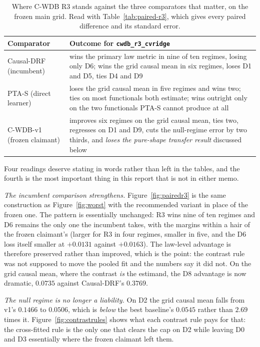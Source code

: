\documentclass[11pt,a4paper]{article}
\theoremstyle{definition}
\theoremstyle{remark}
\begin{document}
\begin{table}[htbp]
\centering
\caption{Where C-WDB R3 stands against the three comparators that matter, on the
frozen main grid. Read with Table~\ref{tab:paired-r3}, which gives every paired
difference and its standard error.}
\label{tab:r3-summary}
\small
\begin{tabular}{@{}lp{9.4cm}@{}}
\toprule
Comparator & Outcome for \texttt{cwdb\_r3\_cvridge} \\
\midrule
Causal-DRF (incumbent) & wins the primary law metric in nine of ten regimes,
losing only D6; wins the grid causal mean in six regimes, loses D1 and D5, ties
D4 and D9 \\
PTA-S (direct learner) & loses the grid causal mean in five regimes and wins two;
ties on most functionals both estimate; wins outright only on the two functionals
PTA-S cannot produce at all \\
C-WDB-v1 (frozen claimant) & improves six regimes on the grid causal mean, ties
two, regresses on D1 and D9, cuts the null-regime error by two thirds, and
\emph{loses the pure-shape transfer result} discussed below \\
\bottomrule
\end{tabular}
\end{table}

Four readings deserve stating in words rather than left in the tables, and the
fourth is the most important thing in this report that is not in either memo.

\emph{The incumbent comparison strengthens.} Figure~\ref{fig:pairedr3} is the
same construction as Figure~\ref{fig:worst} with the recommended variant in place
of the frozen one. The pattern is essentially unchanged: R3 wins nine of ten
regimes and D6 remains the only one the incumbent takes, with the margins within
a hair of the frozen claimant's (larger for R3 in four regimes, smaller in five,
and the D6 loss itself smaller at $+0.0131$ against $+0.0163$). The law-level
advantage is therefore preserved rather than improved, which is the point: the
contrast rule was not supposed to move the pooled fit and the numbers say it did
not. On the grid causal mean, where the contrast \emph{is} the estimand, the D8
advantage is now dramatic, $0.0735$ against Causal-DRF's $0.3769$.

\emph{The null regime is no longer a liability.} On D2 the grid causal mean falls
from v1's $0.1466$ to $0.0506$, which is \emph{below} the best baseline's
$0.0545$ rather than $2.69$ times it. Figure~\ref{fig:contrastrules} shows what
each contrast rule pays for that: the cross-fitted rule is the only one that
clears the cap on D2 while leaving D0 and D3 essentially where the frozen
claimant left them.
\end{document}
